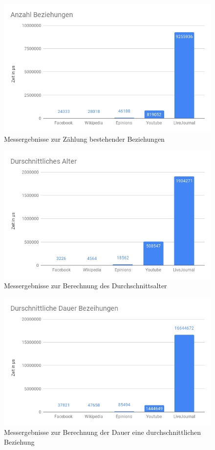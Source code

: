 \begin{figure}[h!]
	\centering
	\includegraphics[width=\textwidth]{images/AnzahlBeziehung.png}
	\caption{Messergebnisse zur Zählung bestehender Beziehungen}
	\label{fig:AnzahlBeziehung}
\end{figure}

\begin{figure}[h!]
	\centering
	\includegraphics[width=\textwidth]{images/DurschAlter.png}
	\caption{Messergebnisse zur Berechnung des Durchschnittsalter}
	\label{fig:DurschAlter}
\end{figure}

\begin{figure}[h!]
	\centering
	\includegraphics[width=\textwidth]{images/DurschBeziehung.png}
	\caption{Messergebnisse zur Berechnung der Dauer eine durchschnittlichen Beziehung}
	\label{fig:DurschBeziehung}
\end{figure}

